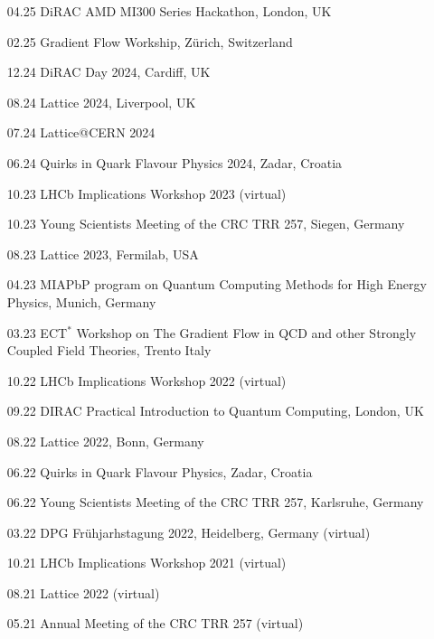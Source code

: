 \documentclass[10pt]{article} %
\begin{document}
\begin{paracol}{2}
\begin{itemize}[noitemsep,topsep=1pt,label=]
    \item [04.25] DiRAC AMD MI300 Series Hackathon, London, UK
    \item [02.25] Gradient Flow Workship, Z\"urich, Switzerland
    \item [12.24] DiRAC Day 2024, Cardiff, UK
    \item [08.24] Lattice 2024, Liverpool, UK
    \item [07.24] Lattice@CERN 2024
    \item [06.24] Quirks in Quark Flavour Physics 2024, Zadar, Croatia
    \item [10.23] LHCb Implications Workshop 2023 (virtual)
    \item [10.23] Young Scientists Meeting of the CRC TRR 257, Siegen, Germany
    \item [08.23] Lattice 2023, Fermilab, USA
    \item [04.23] MIAPbP program on Quantum Computing Methods for High Energy Physics, Munich, Germany
    \item [03.23] ECT$^*$ Workshop on The Gradient Flow in QCD and other Strongly Coupled Field Theories, Trento Italy
    \item [10.22] LHCb Implications Workshop 2022 (virtual)
    \item [09.22] DIRAC Practical Introduction to Quantum Computing, London, UK
    \item [08.22] Lattice 2022, Bonn, Germany
    \item [06.22] Quirks in Quark Flavour Physics, Zadar, Croatia
    \item [06.22] Young Scientists Meeting of the CRC TRR 257, Karlsruhe, Germany
    \item [03.22] DPG Fr\"uhjarhstagung 2022, Heidelberg, Germany (virtual)
    \item [10.21] LHCb Implications Workshop 2021 (virtual)
    \item [08.21] Lattice 2022 (virtual)
    \item [05.21] Annual Meeting of the CRC TRR 257 (virtual) 
\end{itemize}


\switchcolumn %



\end{paracol}
\end{document}
